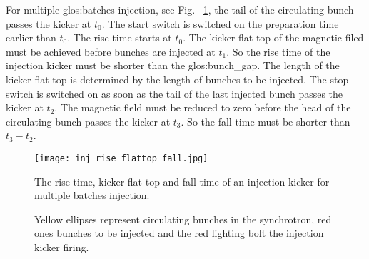 For multiple \gls{glos:batch}es injection, see Fig. ~\ref{inj_rise_flattop_fall}, the tail of the circulating bunch passes the kicker at $t_0$. The start switch is switched on the preparation time earlier than $t_0$. The rise time starts at $t_0$.  The kicker flat-top of the magnetic filed must be achieved before bunches are injected at $t_1$. So the rise time of the injection kicker must be shorter than the \gls{glos:bunch_gap}. The length of the kicker flat-top is determined by the length of bunches to be injected. The stop switch is switched on as soon as the tail of the last injected bunch passes the kicker at $t_2$. The magnetic field must be reduced to zero before the head of the circulating bunch passes the kicker at $t_3$. So the fall time must be shorter than $t_3-t_2$.

\begin{figure}[!htb]
   \centering   
   \texttt{[image: inj\_rise\_flattop\_fall.jpg]}
   \caption{The rise time, kicker flat-top and fall time of an injection kicker for multiple batches injection.}
	\caption*{Yellow ellipses represent circulating bunches in the synchrotron, red ones bunches to be injected and the red lighting bolt the injection kicker firing.}
   \label{inj_rise_flattop_fall}
\end{figure}

%


%
%


